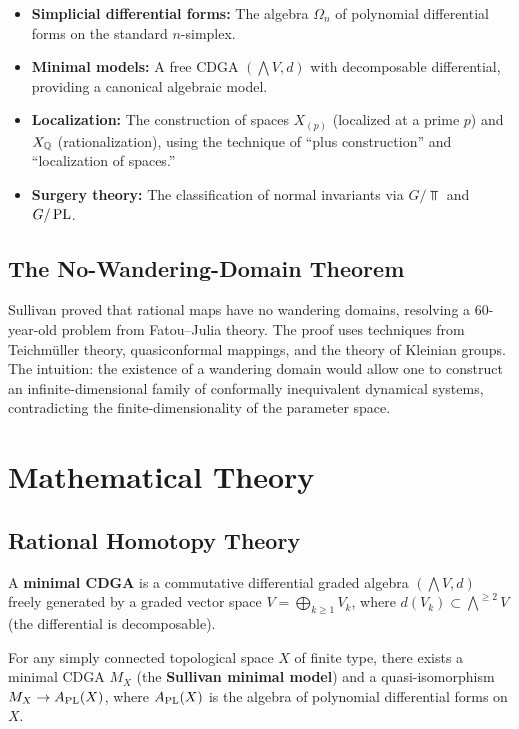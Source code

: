 \begin{itemize}
    \item \textbf{Simplicial differential forms:} The algebra $\Omega_n$ of polynomial differential forms on the standard $n$-simplex.
    \item \textbf{Minimal models:} A free CDGA $(\bigwedge V, d)$ with decomposable differential, providing a canonical algebraic model.
    \item \textbf{Localization:} The construction of spaces $X_{(p)}$ (localized at a prime $p$) and $X_{\mathbb{Q}}$ (rationalization), using the technique of ``plus construction'' and ``localization of spaces.''
    \item \textbf{Surgery theory:} The classification of normal invariants via $G/\Top$ and $G/\operatorname{PL}$.
\end{itemize}

\subsection{The No-Wandering-Domain Theorem}

Sullivan proved that rational maps have no wandering domains, resolving a 60-year-old problem from Fatou--Julia theory. The proof uses techniques from Teichm\"uller theory, quasiconformal mappings, and the theory of Kleinian groups. The intuition: the existence of a wandering domain would allow one to construct an infinite-dimensional family of conformally inequivalent dynamical systems, contradicting the finite-dimensionality of the parameter space.

\section{Mathematical Theory}

\subsection{Rational Homotopy Theory}

\begin{definition}
A \textbf{minimal CDGA} is a commutative differential graded algebra $(\bigwedge V, d)$ freely generated by a graded vector space $V = \bigoplus_{k \geq 1} V_k$, where $d(V_k) \subset \bigwedge^{\geq 2} V$ (the differential is decomposable).
\end{definition}

\begin{theorem}[Sullivan, 1977]
For any simply connected topological space $X$ of finite type, there exists a minimal CDGA $M_X$ (the \textbf{Sullivan minimal model}) and a quasi-isomorphism $M_X \to A_{\operatorname{PL}}(X)$, where $A_{\operatorname{PL}}(X)$ is the algebra of polynomial differential forms on $X$.
\end{theorem}

